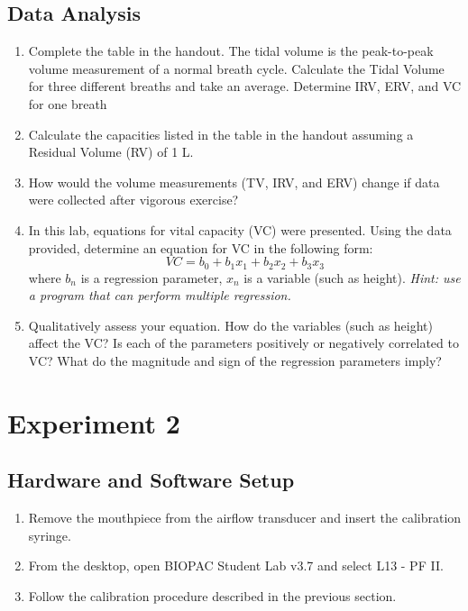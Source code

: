 \documentclass{article}
\begin{document}
\subsection*{Data Analysis}
\begin{enumerate}
	\item Complete the table in the handout. The tidal volume is the peak-to-peak volume measurement of a normal breath cycle. Calculate the Tidal Volume for three different breaths and take an average. Determine IRV, ERV, and VC for one breath
	\item Calculate the capacities listed in the table in the handout assuming a Residual Volume (RV) of 1 L.
	\item How would the volume measurements (TV, IRV, and ERV) change if data were collected after vigorous exercise?
	\item In this lab, equations for vital capacity (VC) were presented. Using the data provided, determine an equation for VC in the following form:\begin{equation}
		VC = b_0 + b_1x_1 + b_2x_2 + b_3x_3
	\end{equation}
	where $b_n$ is a regression parameter, $x_n$ is a variable (such as height). \textit{Hint: use a program that can perform multiple regression.}
	\item Qualitatively assess your equation. How do the variables (such as height) affect the VC? Is each of the parameters positively or negatively correlated to VC? What do the magnitude and sign of the regression parameters imply?
\end{enumerate}

\section*{Experiment 2}
\subsection*{Hardware and Software Setup}
\begin{enumerate}
	\item Remove the mouthpiece from the airflow transducer and insert the calibration syringe.
	\item From the desktop, open BIOPAC Student Lab v3.7 and select L13 - PF II.
	\item Follow the calibration procedure described in the previous section.
\end{enumerate}
\end{document}
